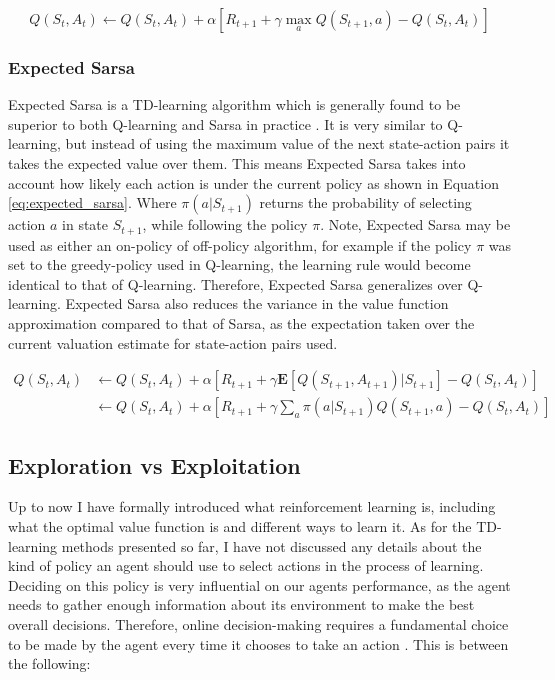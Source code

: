 \documentclass[ %
                    author={Callum Pearce},
                supervisor={Dr. Neill Campbell},
                    degree={MEng},
                     title={How effective are Temporal difference learning methods for reducing the number of zero contribution light paths while still accurately approximating Global Illumination in Path tracing?},
                  subtitle={},
                      type={research},
                      year={2019} ]{dissertation}
\begin{document}
\begin{equation}
Q(S_t, A_t) \leftarrow Q(S_t, A_t) + \alpha[R_{t+1} + \gamma \max_aQ(S_{t+1}, a) - Q(S_t, A_t)]
\end{equation}

\subsubsection{Expected Sarsa}

Expected Sarsa is a TD-learning algorithm which is generally found to be superior to both Q-learning and Sarsa in practice \cite{sutton2011reinforcement}. It is very similar to Q-learning, but instead of using the maximum value of the next state-action pairs it takes the expected value over them. This means Expected Sarsa takes into account how likely each action is under the current policy as shown in Equation \ref{eq:expected_sarsa}. Where $\pi(a | S_{t+1})$ returns the probability of selecting action $a$ in state $S_{t+1}$, while following the policy $\pi$. Note, Expected Sarsa may be used as either an on-policy of off-policy algorithm, for example if the policy $\pi$ was set to the greedy-policy used in Q-learning, the learning rule would become identical to that of Q-learning. Therefore, Expected Sarsa generalizes over Q-learning. Expected Sarsa also reduces the variance in the value function approximation compared to that of Sarsa, as the expectation taken over the current valuation estimate for state-action pairs used.

\begin{align}
Q(S_t, A_t) &  \leftarrow Q(S_t, A_t) + \alpha [R_{t+1} + \gamma \mathbf{E}[Q(S_{t+1}, A_{t+1}) | S_{t+1}] - Q(S_t, A_t)]\\
 & \leftarrow Q(S_t, A_t) + \alpha [R_{t+1} + \gamma \sum_a \pi(a| S_{t+1}) Q(S_{t+1}, a) - Q(S_t, A_t)]
 \label{eq:expected_sarsa}
\end{align}

\subsection{Exploration vs Exploitation}

Up to now I have formally introduced what reinforcement learning is, including what the optimal value function is and different ways to learn it. As for the TD-learning methods presented so far, I have not discussed any details about the kind of policy an agent should use to select actions in the process of learning. Deciding on this policy is very influential on our agents performance, as the agent needs to gather enough information about its environment to make the best overall decisions. Therefore, online decision-making requires a fundamental choice to be made by the agent every time it chooses to take an action \cite{exploration_vs_exploitation}. This is between the following:
\end{document}
